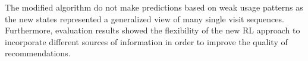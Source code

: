 The modified algorithm do not make predictions based on weak usage patterns as the new states represented a generalized view of many single visit sequences. Furthermore, evaluation results showed the flexibility of the new RL approach to incorporate different sources of information in order to improve the quality of recommendations.

%
%
%
%
